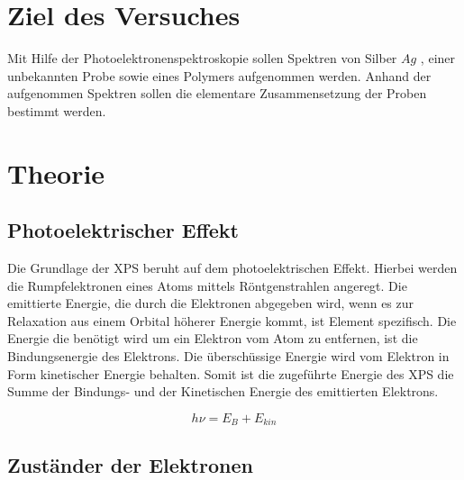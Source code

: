 \documentclass{article}
\begin{document}
\newcommand\setpolymerdelim[2]{\def\delimleft{#1}\def\delimright{#2}}
\def\makebraces[#1,#2]#3#4#5{%
\edef\delimhalfdim{\the\dimexpr(#1+#2)/2}%
\edef\delimvshift{\the\dimexpr(#1-#2)/2}%
\chemmove{%
\node[at=(#4),yshift=(\delimvshift)]
{$\left\delimleft\vrule height\delimhalfdim depth\delimhalfdim
width0pt\right.$};%
\node[at=(#5),yshift=(\delimvshift)]
{$\left.\vrule height\delimhalfdim depth\delimhalfdim
width0pt\right\delimright_{\rlap{$\scriptstyle#3$}}$};}}
\setpolymerdelim()

\section{Ziel des Versuches} Mit Hilfe der Photoelektronenspektroskopie sollen
Spektren von Silber $Ag$ , einer unbekannten Probe sowie eines Polymers
aufgenommen werden. Anhand der aufgenommen Spektren sollen die elementare
Zusammensetzung der Proben bestimmt werden.

\section {Theorie~\supercite{skript} ~\supercite{harris}}

\subsection{Photoelektrischer Effekt}

Die Grundlage der XPS beruht auf dem photoelektrischen Effekt. Hierbei werden
die Rumpfelektronen eines Atoms mittels Röntgenstrahlen angeregt. Die
emittierte Energie, die durch die Elektronen abgegeben wird, wenn es zur
Relaxation aus einem Orbital höherer Energie kommt, ist Element spezifisch. Die
Energie die benötigt wird um ein Elektron vom Atom zu entfernen, ist die
Bindungsenergie des Elektrons. Die überschüssige Energie wird vom Elektron in
Form kinetischer Energie behalten. Somit ist die zugeführte Energie des XPS die
Summe der Bindungs- und der Kinetischen Energie des emittierten Elektrons.

\begin{equation} h\nu = E_B + E_{kin} \end{equation}

\subsection{Zuständer der Elektronen}
\end{document}
